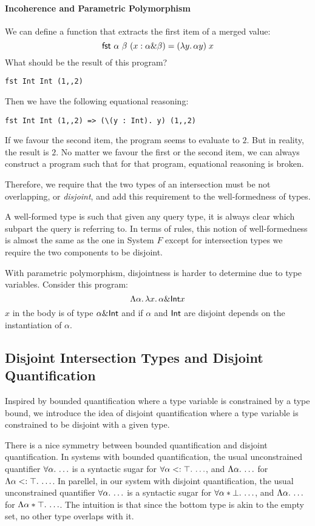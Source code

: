 \paragraph{Incoherence and Parametric Polymorphism}
We can define a  function that extracts the first item of a merged value:
\[
\textsf{fst} \ \alpha \ \beta \ (x : \alpha \& \beta) = (\lambda y.\, \alpha y) \; x
\]
What should be the result of this program?
\begin{lstlisting}
fst Int Int (1,,2)
\end{lstlisting}

Then we have the following equational reasoning:
\begin{lstlisting}
fst Int Int (1,,2) => (\(y : Int). y) (1,,2)
\end{lstlisting}
If we favour the second item, the program seems to evaluate to $2$. But in
reality, the result is $2$. No matter we favour the first or the second item,
we can always construct a program such that for that program, equational
reasoning is broken.

Therefore, we require that the two types of an intersection must be not
overlapping, or \emph{disjoint}, and add this requirement to the well-formedness of types.

A well-formed type is such that given any query type,
it is always clear which subpart the query is referring to.
In terms of rules, this notion of well-formedness is almost the same as the one in System $F$
except for intersection types we require the two components to be disjoint.

With parametric polymorphism, disjointness is harder to determine due to type variables.
Consider this program:
\[
\Lambda \alpha.\, \lambda x.\, \alpha \& \textsf{Int} x
\]
$x$ in the body is of type $\alpha \& \textsf{Int}$ and if $\alpha$ and $\textsf{Int}$ are
disjoint depends on the instantiation of $\alpha$.

\subsection{Disjoint Intersection Types and Disjoint Quantification}

Inspired by bounded quantification where a type variable is constrained by a type bound,
we introduce the idea of disjoint quantification where a type variable is constrained
to be disjoint with a given type.

There is a nice symmetry between bounded quantification and disjoint quantification.
In systems with bounded quantification,
the usual unconstrained quantifier $\forall \alpha.\, \ldots$
is a syntactic sugar for $\forall \alpha <: \top.\, \ldots$, and
$\Lambda \alpha.\, \ldots$ for $\Lambda \alpha <: \top.\, \ldots$.
In parellel, in our system with disjoint quantification,
the usual unconstrained quantifier $\forall \alpha.\, \ldots$
is a syntactic sugar for $\forall \alpha * \bot.\, \ldots$, and
$\Lambda \alpha.\, \ldots$ for $\Lambda \alpha * \top.\, \ldots$.
The intuition is that since the bottom type is akin to the empty set,
no other type overlaps with it.

